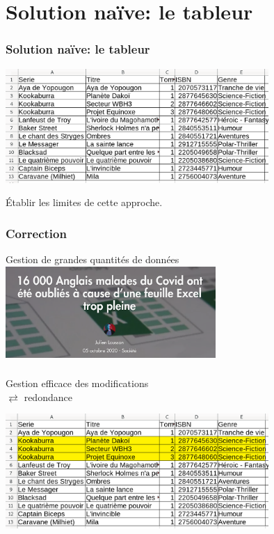 \documentclass[svgnames,11pt]{beamer}
\begin{document}
\section{Solution naïve: le tableur}
\begin{frame}
    \frametitle{Solution naïve: le tableur}

    \begin{center}
        \centering
        \includegraphics[width=10cm]{ressources/approche-1.png}
        \label{IMG}
    \end{center}
    \begin{activite}
        Établir les limites de cette approche.
    \end{activite}
\end{frame}
\begin{frame}
    \frametitle{Correction}
    \begin{center}
        {\Large Gestion de grandes quantités de données}\\
        \href{https://www.numerama.com/politique/653217-16-000-anglais-malades-du-covid-ont-ete-oublies-a-cause-dune-feuille-excel-trop-pleine.html}{\includegraphics[width=8cm]{ressources/oublies.png}}
    \end{center}
\end{frame}
\begin{frame}
    \frametitle{}

    \begin{center}
        {\Large Gestion efficace des modifications\\ $\rightleftarrows$ redondance}
    \end{center}
    \begin{center}
        \includegraphics[width=10cm]{ressources/approche-11.png}
    \end{center}
\end{frame}
\end{document}
